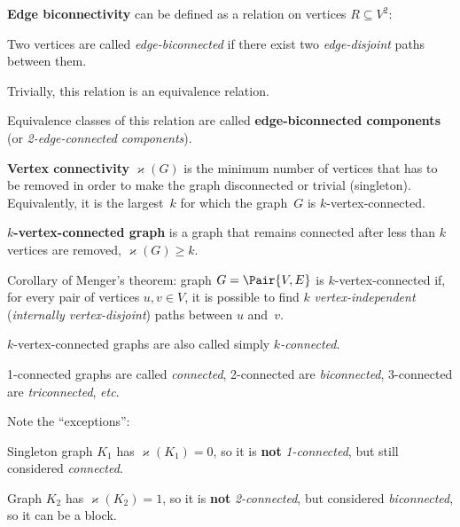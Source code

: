 \documentclass[a4paper,10pt]{article}
\newcommand{\vertexConnectivity}[1]{\varkappa(#1)}
\begin{document}
\begin{terms}
    \item \textbf{Edge biconnectivity} can be defined as a relation on vertices $R \subseteq V^2$:
    \begin{terms}
        \item Two vertices are called \emph{edge-biconnected} if there exist two \emph{edge-disjoint} paths between them.
        \item Trivially, this relation is an equivalence relation.
        \item Equivalence classes of this relation are called \textbf{edge-biconnected components} (or \emph{2-edge-connected components}).
    \end{terms}

    \item \textbf{Vertex connectivity} $\vertexConnectivity{G}$ is the minimum number of vertices that has to be removed in order to make the graph disconnected or trivial (singleton).
    Equivalently, it is the largest~$k$ for which the graph~$G$ is $k$-vertex-connected.

    \item \textbf{$k$-vertex-connected graph} is a graph that remains connected after less than $k$ vertices are removed, \ie $\vertexConnectivity{G} \geq k$.
    \begin{terms}
        \item Corollary of Menger's theorem: graph $G = \Pair{V,E}$ is $k$-vertex-connected if, for every pair of vertices $u,v \in V$, it is possible to find $k$ \emph{vertex-independent} (\emph{internally vertex-disjoint}) paths between $u$ and~$v$.

        \item $k$-vertex-connected graphs are also called simply \emph{$k$-connected}.

        \item 1-connected graphs are called \emph{connected}, 2-connected are \emph{biconnected}, 3-connected are \emph{triconnected}, \textit{etc}.

        \item Note the \enquote{exceptions}:
        \begin{terms}
            \item Singleton graph $K_1$ has $\vertexConnectivity{K_1} = 0$, so it is \textbf{not} \emph{1-connected}, but still considered \emph{connected}.

            \item Graph $K_2$ has $\vertexConnectivity{K_2} = 1$, so it is \textbf{not} \emph{2-connected}, but considered \emph{biconnected}, so it can be a block.


\end{terms}
\end{terms}
\end{terms}
\end{document}
